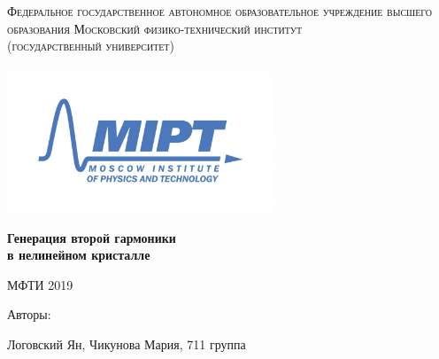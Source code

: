 \begin{titlepage}

\begin{center}

\vspace*{-40pt}
\textsc{\large Федеральное государственное автономное образовательное учреждение высшего образования Московский физико-технический институт\\ (государственный университет)}\\
\vspace{48pt}

\includegraphics[width=0.6\textwidth]{images/logo.jpg}

\vfill
{ \LARGE \textbf{ Генерация второй гармоники}}\\
\vspace{10pt}
{ \LARGE \textbf{в нелинейном кристалле}}\\
\vfill

{\large МФТИ}
{\large 2019}

\end{center}

Авторы: 

Логовский Ян, Чикунова Мария, 711 группа
\end{titlepage}

